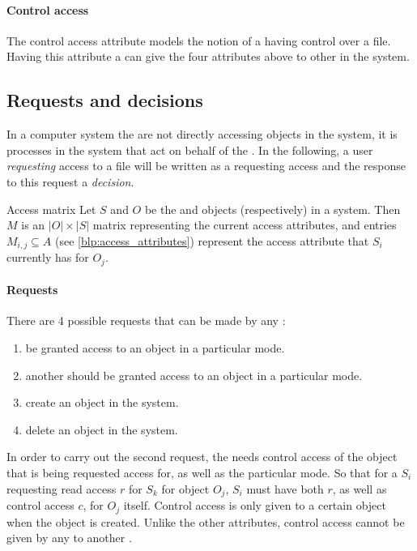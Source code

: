 \paragraph{Control access}
The control access attribute models the notion of a \ssubject{} having control over a file.
Having this attribute a \ssubject{} can give the four attributes above to other \subjects{} in the system.

\subsection{Requests and decisions}
In a computer system the \subjects{} are not directly accessing objects in the system, it is processes in the system that act on behalf of the \ssubject{}.
In the following, a user \emph{requesting} access to a file will be written as a \ssubject{} requesting access and the response to this request a \emph{decision}.

\begin{definition}{Access matrix}\label{blp:def:accessmatrix}
  Let $S$ and $O$ be the \subjects{} and objects (respectively) in a system.
  Then $M$ is an $|O| \times |S|$ matrix representing the current access attributes, and entries $M_{i,j} \subseteq A$ (see \cref{blp:access_attributes}) represent the access attribute that $S_i$ currently has for $O_j$.
\end{definition}

\paragraph{Requests}
There are 4 possible requests that can be made by any \ssubject{}:
\begin{enumerate}
  \item be granted access to an object in a particular mode.
  \item another \ssubject{} should be granted access to an object in a particular mode.
  \item create an object in the system.
  \item delete an object in the system.
\end{enumerate}

In order to carry out the second request, the \ssubject{} needs control access of the object that is being requested access for, as well as the particular mode.
So that for a \ssubject{} $S_i$ requesting read access $r$ for \ssubject{} $S_k$ for object $O_j$, $S_i$ must have both $r$, as well as control access $c$, for $O_j$ itself.
Control access is only given to a certain object when the object is created.
Unlike the other attributes, control access cannot be given by any \ssubject{} to another \ssubject{}.

